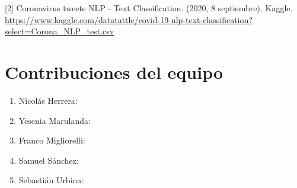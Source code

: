 \documentclass[
]{article}
\providecommand{\tightlist}{%
  \setlength{\itemsep}{0pt}\setlength{\parskip}{0pt}}
\begin{document}
{[}2{]} Coronavirus tweets NLP - Text Classification. (2020, 8
septiembre). Kaggle.
\url{https://www.kaggle.com/datatattle/covid-19-nlp-text-classification?select=Corona_NLP_test.csv}

\hypertarget{contribuciones-del-equipo}{%
\section{Contribuciones del equipo}\label{contribuciones-del-equipo}}

\begin{enumerate}
\def\labelenumi{\arabic{enumi}.}
\tightlist
\item
  Nicolás Herrera:
\item
  Yesenia Marulanda:
\item
  Franco Migliorelli:
\item
  Samuel Sánchez:
\item
  Sebastián Urbina:
\end{enumerate}
\end{document}
